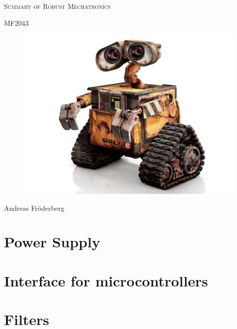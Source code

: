 \documentclass[10pt,a4paper]{article}
\begin{document}
\begin{titlepage}
    \centering
    {\scshape\LARGE Summary of Robust Mechatronics \par}
    {\scshape MF2043 \par}
    \vspace{2cm}
    \begin{figure}[H]
        \includegraphics[scale=0.7]{./figures/wall-e.jpg}
    \end{figure}
    \vspace{3cm}
    Andreas Fröderberg
\end{titlepage}
\section{Power Supply}

\clearpage
\section{Interface for microcontrollers}

\clearpage
\section{Filters}

\end{document}
